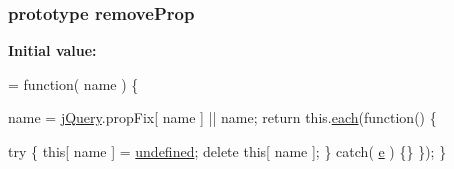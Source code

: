 \subsubsection[{remove\+Prop}]{ {\bf prototype} remove\+Prop}\label{jquery-1_810_82-vsdoc_8js_a5f3c3bda90c5d61345bf87ec3eac6145}
{\bfseries Initial value\+:}
\begin{DoxyCode}
= \textcolor{keyword}{function}( name ) \{


        name = \hyperlink{jquery-1_810_82-vsdoc_8js_add5237586d970a38a81f990e8eb28c6c}{jQuery}.propFix[ name ] || name;
        \textcolor{keywordflow}{return} this.\hyperlink{jquery-1_810_82-vsdoc_8js_aae0bcb6b00035445a8f9b262c96ea8a2}{each}(\textcolor{keyword}{function}() \{
            
            \textcolor{keywordflow}{try} \{
                \textcolor{keyword}{this}[ name ] = \hyperlink{jquery-1_810_82-vsdoc_8js_a08113a236cc18d2a9d5ce27e638012be}{undefined};
                \textcolor{keyword}{delete} \textcolor{keyword}{this}[ name ];
            \} \textcolor{keywordflow}{catch}( \hyperlink{_bibabook_2_scripts_2jquery-1_810_82_8min_8js_a2c038346d47955cbe2cb91e338edd7e1}{e} ) \{\}
        \});
    \}
\end{DoxyCode}
\hypertarget{jquery-1_810_82-vsdoc_8js_a2e887b3101a3bb067b3acfd8d292ceb0}{}
